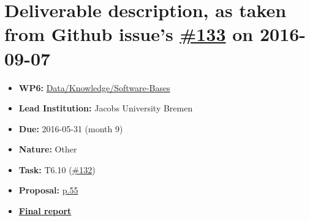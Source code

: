 \section*{\texorpdfstring{Deliverable description, as taken from Github
issue's
\href{https://github.com/OpenDreamKit/OpenDreamKit/issues/133}{\#133} on
2016-09-07}{Deliverable description, as taken from Github issue's \#133 on 2016-09-07}}\label{deliverable-description-as-taken-from-github-issues-133-on-2016-09-07}

\begin{itemize}
\tightlist
\item
  \textbf{WP6:}
  \href{https://github.com/OpenDreamKit/OpenDreamKit/tree/master/WP6}{Data/Knowledge/Software-Bases}
\item
  \textbf{Lead Institution:} Jacobs University Bremen
\item
  \textbf{Due:} 2016-05-31 (month 9)
\item
  \textbf{Nature:} Other
\item
  \textbf{Task:} T6.10
  (\href{https://github.com/OpenDreamKit/OpenDreamKit/issues/132}{\#132})
\item
  \textbf{Proposal:}
  \href{https://github.com/OpenDreamKit/OpenDreamKit/raw/master/Proposal/proposal-www.pdf}{p.55}
\item
  \textbf{\href{https://github.com/OpenDreamKit/OpenDreamKit/raw/master/WP6/D6.1/report-final.pdf}{Final
  report}}
\end{itemize}
